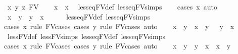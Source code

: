 \begin{isabellebody}
\ x\ y\ z\ {\isacharcolon}{\kern0pt}{\isacharcolon}{\kern0pt}FV\isanewline
\ \ \isamarkupfalse%
\ {\isachardoublequoteopen}x\ {\isasymle}\ x{\isachardoublequoteclose}\ \isamarkupfalse%
\ less{\isacharunderscore}{\kern0pt}eq{\isacharunderscore}{\kern0pt}FV{\isacharunderscore}{\kern0pt}def\ less{\isacharunderscore}{\kern0pt}eq{\isacharunderscore}{\kern0pt}FV{\isachardot}{\kern0pt}simps\ \isanewline
\ \ \isamarkupfalse%
{\isacharparenleft}{\kern0pt}cases\ x{\isacharcomma}{\kern0pt}\ auto{\isacharparenright}{\kern0pt}\ \isamarkupfalse%
\isanewline
\ \ \isamarkupfalse%
\ {\isachardoublequoteopen}x\ {\isasymle}\ y\ {\isasymor}\ y\ {\isasymle}\ x{\isachardoublequoteclose}\isanewline
\ \ \ \ \isamarkupfalse%
\ less{\isacharunderscore}{\kern0pt}eq{\isacharunderscore}{\kern0pt}FV{\isacharunderscore}{\kern0pt}def\ less{\isacharunderscore}{\kern0pt}eq{\isacharunderscore}{\kern0pt}FV{\isachardot}{\kern0pt}simps\ \isanewline
\ \ \ \ \isamarkupfalse%
{\isacharparenleft}{\kern0pt}cases\ x\ rule{\isacharcolon}{\kern0pt}\ FV{\isacharunderscore}{\kern0pt}cases{\isacharparenright}{\kern0pt}\ {\isacharparenleft}{\kern0pt}cases\ y\ rule{\isacharcolon}{\kern0pt}\ FV{\isacharunderscore}{\kern0pt}cases{\isacharcomma}{\kern0pt}\ auto{\isacharparenright}{\kern0pt}{\isacharplus}{\kern0pt}\isanewline
\ \ \isamarkupfalse%
\ {\isachardoublequoteopen}{\isacharparenleft}{\kern0pt}x\ {\isacharless}{\kern0pt}\ y{\isacharparenright}{\kern0pt}\ {\isacharequal}{\kern0pt}\ {\isacharparenleft}{\kern0pt}x\ {\isasymle}\ y\ {\isasymand}\ {\isasymnot}\ y\ {\isasymle}\ x{\isacharparenright}{\kern0pt}{\isachardoublequoteclose}\isanewline
\ \ \isamarkupfalse%
\ less{\isacharunderscore}{\kern0pt}FV{\isacharunderscore}{\kern0pt}def\ less{\isacharunderscore}{\kern0pt}FV{\isachardot}{\kern0pt}simps\ less{\isacharunderscore}{\kern0pt}eq{\isacharunderscore}{\kern0pt}FV{\isacharunderscore}{\kern0pt}def\ less{\isacharunderscore}{\kern0pt}eq{\isacharunderscore}{\kern0pt}FV{\isachardot}{\kern0pt}simps\ \isanewline
\ \ \isamarkupfalse%
{\isacharparenleft}{\kern0pt}cases\ x\ rule{\isacharcolon}{\kern0pt}\ FV{\isacharunderscore}{\kern0pt}cases{\isacharparenright}{\kern0pt}\ {\isacharparenleft}{\kern0pt}cases\ y\ rule{\isacharcolon}{\kern0pt}\ FV{\isacharunderscore}{\kern0pt}cases{\isacharcomma}{\kern0pt}\ auto{\isacharparenright}{\kern0pt}\isanewline
\ \ \isamarkupfalse%
\ {\isachardoublequoteopen}x\ {\isasymle}\ y\ {\isasymLongrightarrow}\ y\ {\isasymle}\ x\ {\isasymLongrightarrow}\ x\ {\isacharequal}{\kern0pt}\ y{\isachardoublequoteclose}\isanewline

\end{isabellebody}
